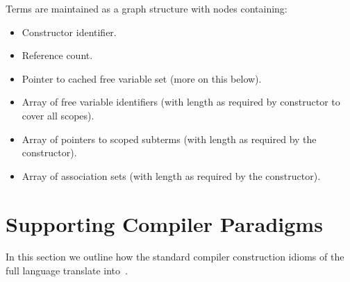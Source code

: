\documentclass[letterpaper,11pt]{article}
\begin{document}
\begin{structure}
  Terms are maintained as a graph structure with nodes containing:
  \begin{itemize}
  \item Constructor identifier.
  \item Reference count.
  \item Pointer to cached free variable set (more on this below).
  \item Array of free variable identifiers (with length as required by constructor to cover all
    scopes).
  \item Array of pointers to scoped subterms (with length as required by the constructor).
  \item Array of association sets (with length as required by the constructor).
  \end{itemize}
\end{structure}

\begin{structure}
  
\end{structure}








\section{Supporting Compiler Paradigms}
\label{sec:compiling}

In this section we outline how the standard compiler construction idioms of the full \HAX language
translate into~\hax.
\end{document}
